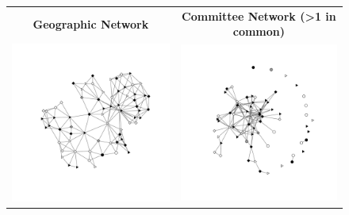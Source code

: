\documentclass[12pt]{article}
\begin{document}
\begin{figure}
\centering
\begin{tabular}{cc}
{\bf Geographic Network} & {\bf Committee Network (>1 in common)}\\
\includegraphics[scale=.55, clip=true,trim =2cm 2cm 2cm 2cm ]{./images/coppock_geographic_net.pdf} & \includegraphics[scale=.55, clip=true,trim =2cm 2cm 2cm 2cm]{./images/nm_committee_net.pdf} \\ 

\end{tabular}
\end{figure}
\end{document}
